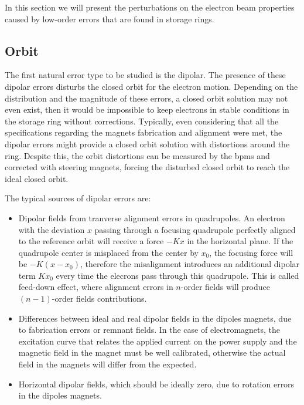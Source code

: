 In this section we will present the perturbations on the electron beam properties caused by low-order errors that are found in storage rings. 

\subsection{Orbit}\label{subset:orbit}

The first natural error type to be studied is the dipolar. The presence of these dipolar errors disturbs the closed orbit for the electron motion. Depending on the distribution and the magnitude of these errors, a closed orbit solution may not even exist, then it would be impossible to keep electrons in stable conditions in the storage ring without corrections. Typically, even considering that all the specifications regarding the magnets fabrication and alignment were met, the dipolar errors might provide a closed orbit solution with distortions around the ring. Despite this, the orbit distortions can be measured by the \gls{bpm}s and corrected with steering magnets, forcing the disturbed closed orbit to reach the ideal closed orbit.

The typical sources of dipolar errors are:

\begin{itemize}
    \item Dipolar fields from tranverse alignment errors in quadrupoles. An electron with the deviation $x$ passing through a focusing quadrupole perfectly aligned to the reference orbit will receive a force $-Kx$ in the horizontal plane. If the quadrupole center is misplaced from the center by $x_0$, the focusing force will be $-K(x - x_0)$, therefore the misalignment introduces an additional dipolar term $K x_0$ every time the elecrons pass through this quadrupole. This is called feed-down effect, where alignment errors in $n$-order fields will produce $(n-1)$-order fields contributions.
    
    \item Differences between ideal and real dipolar fields in the dipoles magnets, due to fabrication errors or remnant fields. In the case of electromagnets, the excitation curve that relates the applied current on the power supply and the magnetic field in the magnet must be well calibrated, otherwise the actual field in the magnets will differ from the expected. 
    
    \item Horizontal dipolar fields, which should be ideally zero, due to rotation errors in the dipoles magnets.
\end{itemize}

